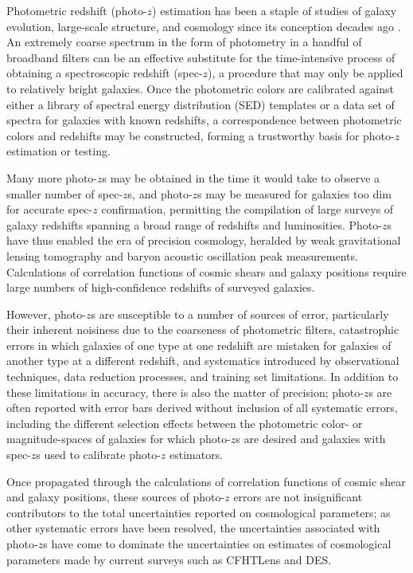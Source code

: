 \documentclass[preprint]{aastex}
\begin{document}
Photometric redshift (photo-$z$) estimation has been a staple of studies of 
galaxy evolution, large-scale structure, and cosmology since its conception 
decades ago \citep{Baum1962}.  An extremely coarse spectrum in the form of 
photometry in a handful of broadband filters can be an effective substitute for 
the time-intensive process of obtaining a spectroscopic redshift (spec-$z$), a 
procedure that may only be applied to relatively bright galaxies.  Once the 
photometric colors are calibrated against either a library of spectral energy 
distribution (SED) templates or a data set of spectra for galaxies with known 
redshifts, a correspondence between photometric colors and redshifts may be 
constructed, forming a trustworthy basis for photo-$z$ estimation or testing.

Many more photo-$z$s may be obtained in the time it would take to observe a 
smaller number of spec-$z$s, and photo-$z$s may be measured for galaxies too 
dim for accurate spec-$z$ confirmation, permitting the compilation of large 
surveys of galaxy redshifts spanning a broad range of redshifts and 
luminosities.  Photo-$z$s have thus enabled the era of precision cosmology, 
heralded by weak gravitational lensing tomography and baryon acoustic 
oscillation peak measurements.  Calculations of correlation functions of cosmic 
shears and galaxy positions require large numbers of high-confidence redshifts 
of surveyed galaxies.  

However, photo-$z$s are susceptible to a number of sources of error, 
particularly their inherent noisiness due to the coarseness of photometric 
filters, catastrophic errors in which galaxies of one type at one redshift are 
mistaken for galaxies of another type at a different redshift, and systematics 
introduced by observational techniques, data reduction processes, and training 
set limitations.  In addition to these limitations in accuracy, there is also 
the matter of precision; photo-$z$s are often reported with error bars derived 
without inclusion of all systematic errors, including the different selection 
effects between the photometric color- or magnitude-spaces of galaxies for 
which photo-$z$s are desired and galaxies with spec-$z$s used to calibrate 
photo-$z$ estimators.

Once propagated through the calculations of correlation functions of cosmic 
shear and galaxy positions, these sources of photo-$z$ errors are not 
insignificant contributors to the total uncertainties reported on cosmological 
parameters; as other systematic errors have been resolved, the uncertainties 
associated with photo-$z$s have come to dominate the uncertainties on estimates 
of cosmological parameters made by current surveys such as CFHTLens and DES.
\end{document}
